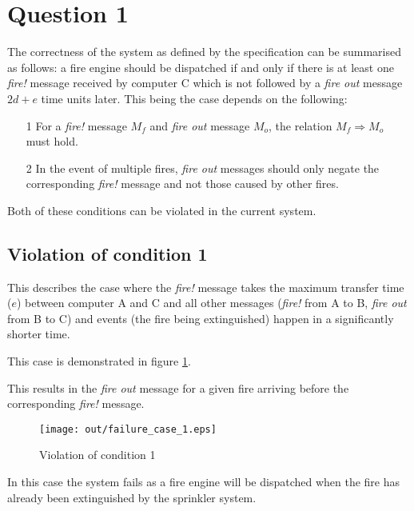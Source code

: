 \documentclass[twocolumn]{article}
\title{\DOCTITLE}
\author{\DOCAUTHOR}
\date{\DOCDATE}
\begin{document}
\section{Question 1}

The correctness of the system as defined by the specification can be summarised
as follows: a fire engine should be dispatched if and only if there is at least
one \textit{fire!} message received by computer C which is not followed by a
\textit{fire out} message $2d + e$ time units later. This being the case depends
on the following:

\begin{enumerate}
  \item[1] For a \textit{fire!} message $M_{f}$ and \textit{fire out} message
           $M_{o}$, the relation $M_{f} \Rightarrow M_{o}$ must hold.
  \item[2] In the event of multiple fires, \textit{fire out} messages should
           only negate the corresponding \textit{fire!} message and not those
           caused by other fires.
\end{enumerate}

Both of these conditions can be violated in the current system.

\subsection{Violation of condition 1}
\label{sec:violation_of_condition_1}

This describes the case where the \textit{fire!} message takes the maximum
transfer time ($e$) between computer A and C and all other messages
(\textit{fire!} from A to B, \textit{fire out} from B to C) and events (the fire
being extinguished) happen in a significantly shorter time.

This case is demonstrated in figure \ref{fig:failure_case_1}.

This results in the \textit{fire out} message for a given fire arriving before
the corresponding \textit{fire!} message.

\begin{figure}[h!]
  \centering
  \texttt{[image: out/failure\_case\_1.eps]}
  \caption{Violation of condition 1}
  \label{fig:failure_case_1}
\end{figure}

In this case the system fails as a fire engine will be dispatched when the fire
has already been extinguished by the sprinkler system.
\end{document}
